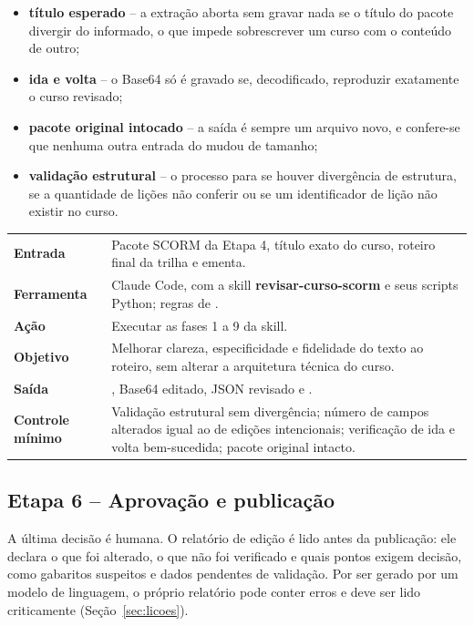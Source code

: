 \documentclass[12pt,a4paper]{article}
\makeatletter
\newcommand{\campo}[1]{\textcolor{azulinst}{\textbf{#1}}}
\newcommand{\skill}[1]{\textsf{\textbf{#1}}}
\newenvironment{ficha}
  {\begin{longtable}{@{}L{0.24\textwidth}L{0.72\textwidth}@{}}\toprule}
  {\bottomrule\end{longtable}}
\makeatother
\begin{document}
\begin{itemize}[leftmargin=*]
\item \textbf{título esperado} -- a extração aborta sem gravar nada se o título do pacote divergir do informado, o que impede sobrescrever um curso com o conteúdo de outro;
\item \textbf{ida e volta} -- o Base64 só é gravado se, decodificado, reproduzir exatamente o curso revisado;
\item \textbf{pacote original intocado} -- a saída é sempre um arquivo novo, e confere-se que nenhuma outra entrada do  mudou de tamanho;
\item \textbf{validação estrutural} -- o processo para se houver divergência de estrutura, se a quantidade de lições não conferir ou se um identificador de lição não existir no curso.
\end{itemize}

\begin{ficha}
\campo{Entrada} & Pacote SCORM da Etapa 4, título exato do curso, roteiro final da trilha e ementa. \\ \addlinespace
\campo{Ferramenta} & Claude Code, com a skill \skill{revisar-curso-scorm} e seus scripts Python; regras de . \\ \addlinespace
\campo{Ação} & Executar as fases 1 a 9 da skill. \\ \addlinespace
\campo{Objetivo} & Melhorar clareza, especificidade e fidelidade do texto ao roteiro, sem alterar a arquitetura técnica do curso. \\ \addlinespace
\campo{Saída} & , Base64 editado, JSON revisado e . \\ \addlinespace
\campo{Controle mínimo} & Validação estrutural sem divergência; número de campos alterados igual ao de edições intencionais; verificação de ida e volta bem-sucedida; pacote original intacto. \\
\end{ficha}

\subsection{Etapa 6 -- Aprovação e publicação}

A última decisão é humana. O relatório de edição é lido antes da publicação: ele declara o que foi alterado, o que não foi verificado e quais pontos exigem decisão, como gabaritos suspeitos e dados pendentes de validação. Por ser gerado por um modelo de linguagem, o próprio relatório pode conter erros e deve ser lido criticamente (Seção~\ref{sec:licoes}).
\end{document}
